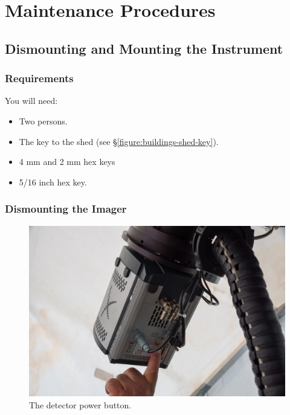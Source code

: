 \section{Maintenance Procedures}

\subsection{Dismounting and Mounting the Instrument}
\label{section:huitzi-f8-dismounting-and-mounting}

\subsubsection{Requirements}

You will need:

\begin{itemize}
    \item Two persons.
    \item The key to the shed (see \S\ref{figure:buildings-shed-key}).
    \item 4 mm and 2 mm hex keys
    \item 5/16 inch hex key.
\end{itemize}

\subsubsection{Dismounting the Imager}

\begin{figure}
\begin{center}
\includegraphics[width=0.8\linewidth]{figures/huitzi-f8-detector-power-button.jpg}
\end{center}
\caption{The detector power button.}
\label{figure:huitzi-f8-detector-power-button}
\end{figure}

